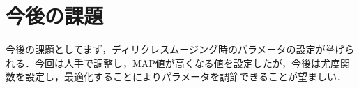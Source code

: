 \section{今後の課題}
今後の課題としてまず，ディリクレスムージング時のパラメータの設定が挙げられる．今回は人手で調整し，MAP値が高くなる値を設定したが，今後は尤度関数を設定し，最適化することによりパラメータを調節できることが望ましい．




